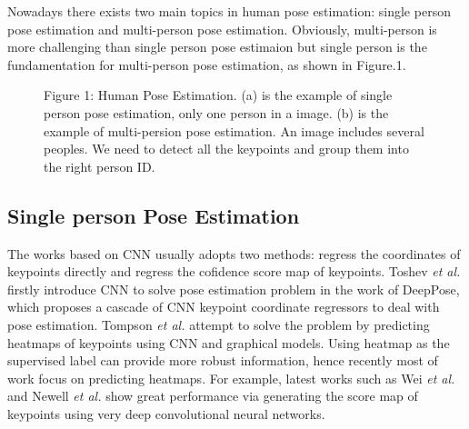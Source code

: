 Nowadays there exists two main topics in human pose estimation: single person pose estimation and multi-person pose estimation. Obviously, multi-person is more challenging than single person pose estimaion but single person is the fundamentation for multi-person pose estimation, as shown in Figure.1.

\captionsetup[figure]{labelformat=empty}
\begin{figure}
  \centering
  \hspace{1in}
  \caption{Figure 1: Human Pose Estimation. (a) is the example of single person pose estimation, only one person in a image. (b) is the example of multi-persion pose
  estimation. An image includes several peoples. We need to detect all the keypoints and group them into the right person ID.}
  \label{fig:1} %
\end{figure}

\subsection{Single person Pose Estimation}
The works based on CNN usually adopts two methods: regress the coordinates of keypoints directly and regress the cofidence score map of keypoints. Toshev \textit{et al.} firstly introduce
CNN to solve pose estimation problem in the work of DeepPose\cite{toshev2014deeppose}, which proposes a cascade of CNN keypoint coordinate regressors to deal with pose estimation. Tompson \textit{et al.}\cite{tompson2014joint}
attempt to solve the problem by predicting heatmaps of keypoints using CNN and graphical models.
Using heatmap as the supervised label can provide more robust information, hence recently most of work focus on predicting heatmaps.
For example, latest works such as Wei \textit{et al.}\cite{wei2016convolutional} and Newell \textit{et al.}\cite{newell2016stacked} show great performance via generating the score map of keypoints using very
deep convolutional neural networks.

